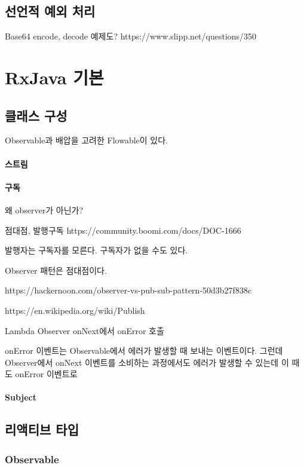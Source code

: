 \documentclass{book}
\begin{document}
\section{선언적 예외 처리}
Base64 encode, decode 예제도?
https://www.slipp.net/questions/350

\chapter{RxJava 기본}


\section{클래스 구성}
Observable과 배압을 고려한 Flowable이 있다.

\subsubsection{스트림}

\subsubsection{구독}
왜 observer가 아닌가?

점대점, 발행구독
https://community.boomi.com/docs/DOC-1666

발행자는 구독자를 모른다. 구독자가 없을 수도 있다.

Observer 패턴은 점대점이다. 

https://hackernoon.com/observer-vs-pub-sub-pattern-50d3b27f838c

https://en.wikipedia.org/wiki/Publish%

Lambda Observer onNext에서 onError 호출

onError 이벤트는 Observable에서 에러가 발생할 때 보내는 이벤트이다. 그런데 Observer에서 onNext 이벤트를 소비하는 과정에서도 에러가 발생할 수 있는데 이 때도 onError 이벤트로 


\subsubsection{Subject}

\section{리액티브 타입}
\subsection{Observable}
\end{document}
